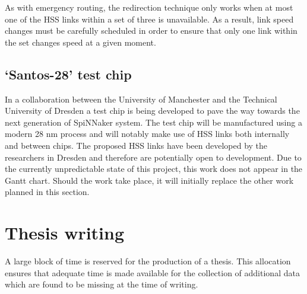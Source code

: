 			As with emergency routing, the redirection technique only works when at
			most one of the HSS links within a set of three is unavailable. As a
			result, link speed changes must be carefully scheduled in order to ensure
			that only one link within the set changes speed at a given moment.
		
		\subsection{`Santos-28' test chip}
			
			
			In a collaboration between the University of Manchester and the Technical
			University of Dresden a test chip is being developed to pave the way
			towards the next generation of SpiNNaker system. The test chip will be
			manufactured using a modern 28 nm process and will notably make use of HSS
			links both internally and between chips. The proposed HSS links have been
			developed by the researchers in Dresden and therefore are potentially open
			to development. Due to the currently unpredictable state of this project,
			this work does not appear in the Gantt chart. Should the work take place,
			it will initially replace the other work planned in this section.
	
	\section{Thesis writing}
		
		A large block of time is reserved for the production of a thesis. This
		allocation ensures that adequate time is made available for the collection
		of additional data which are found to be missing at the time of writing.
